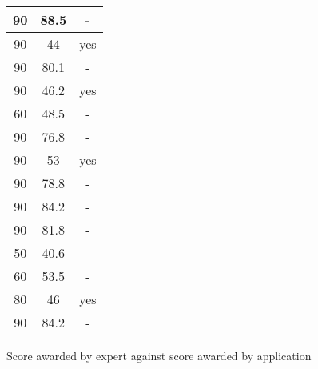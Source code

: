 \begin{figure}[H]
\begin{tabular}{ | c | c | c | }
		90 & 88.5 & - \\ \hline
		90 & 44 & yes \\ \hline
		90 & 80.1 & - \\ \hline
		90 & 46.2 & yes \\ \hline
		60 & 48.5 & - \\ \hline
		90 & 76.8 & - \\ \hline
		90 & 53 & yes \\ \hline
		90 & 78.8 & - \\ \hline
		90 & 84.2 & - \\ \hline
		90 & 81.8 & - \\ \hline
		50 & 40.6 & - \\ \hline
		60 & 53.5 & - \\ \hline
		80 & 46 & yes \\ \hline
		90 & 84.2 & - \\ \hline
    \end{tabular}
\caption{Score awarded by expert against score awarded by application}
\label{fig:analysisevalscores}
\end{figure}


